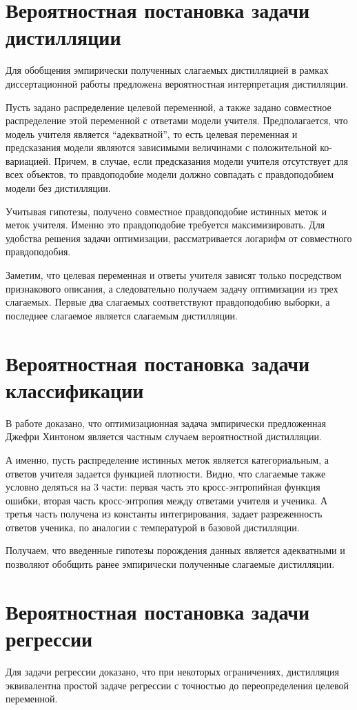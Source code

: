 \documentclass[10pt, twoside]{article}
\begin{document}
\section{Вероятностная постановка задачи дистилляции}
Для обобщения эмпирически полученных слагаемых дистилляцией в рамках диссертационной работы предложена вероятностная интерпретация дистилляции.

Пусть задано распределение целевой переменной, а также задано совместное распределение этой переменной с ответами модели учителя. Предполагается, что модель учителя является ``адекватной'', то есть целевая переменная и предсказания модели являются зависимыми величинами с положительной ко-вариацией. Причем, в случае, если предсказания модели учителя отсутствует для всех объектов, то правдоподобие модели должно совпадать с правдоподобием модели без дистилляции.

Учитывая гипотезы, получено совместное правдоподобие истинных меток и меток учителя. Именно это правдоподобие требуется максимизировать. Для удобства решения задачи оптимизации, рассматривается логарифм от совместного правдоподобия.

Заметим, что целевая переменная и ответы учителя зависят только посредством признакового описания, а следовательно получаем задачу оптимизации из трех слагаемых. Первые два слагаемых соответствуют правдоподобию выборки, а последнее слагаемое является слагаемым дистилляции.

\section{Вероятностная постановка задачи классификации}
В работе доказано, что оптимизационная задача эмпирически предложенная Джефри Хинтоном является частным случаем вероятностной дистилляции.

А именно, пусть распределение истинных меток является категориальным, а ответов учителя задается функцией плотности. Видно, что слагаемые также условно деляться на 3 части: первая часть это кросс-энтропийная функция ошибки, вторая часть кросс-энтропия между ответами учителя и ученика. А третья часть получена из константы интегрирования, задает разреженность ответов ученика, по аналогии с температурой в базовой дистилляции.

Получаем, что введенные гипотезы порождения данных является адекватными и позволяют обобщить ранее эмпирически полученные слагаемые дистилляции.

\section{Вероятностная постановка задачи регрессии}
Для задачи регрессии доказано, что при некоторых ограничениях, дистилляция эквивалентна простой задаче регрессии с точностью до переопределения целевой переменной.
\end{document}
